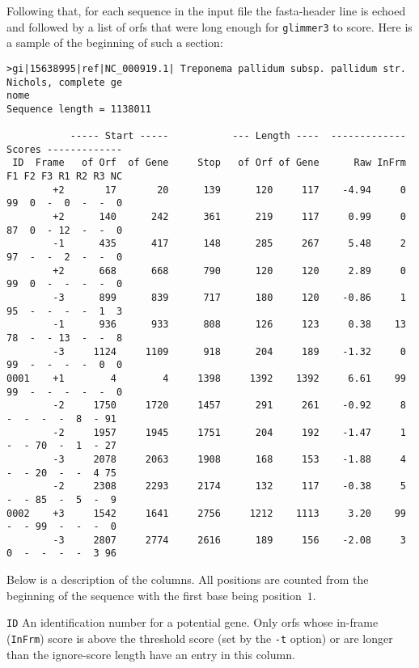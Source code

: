 \documentclass[fleqn,titlepage,11pt]{article}
\def\Pg#1{\texttt{#1}}
\begin{document}
Following that, for each sequence in the input file the
fasta-header line is echoed and followed by a list of orfs
that were long enough for \Pg{glimmer3} to score.  Here is
a sample of the beginning of such a section:
\BSV
\begin{verbatim}
>gi|15638995|ref|NC_000919.1| Treponema pallidum subsp. pallidum str. Nichols, complete ge
nome
Sequence length = 1138011

           ----- Start -----           --- Length ----  ------------- Scores -------------
 ID  Frame   of Orf  of Gene     Stop   of Orf of Gene      Raw InFrm F1 F2 F3 R1 R2 R3 NC
        +2       17       20      139      120     117    -4.94     0 99  0  -  0  -  -  0
        +2      140      242      361      219     117     0.99     0 87  0  - 12  -  -  0
        -1      435      417      148      285     267     5.48     2 97  -  -  2  -  -  0
        +2      668      668      790      120     120     2.89     0 99  0  -  -  -  -  0
        -3      899      839      717      180     120    -0.86     1 95  -  -  -  -  1  3
        -1      936      933      808      126     123     0.38    13 78  -  - 13  -  -  8
        -3     1124     1109      918      204     189    -1.32     0 99  -  -  -  -  0  0
0001    +1        4        4     1398     1392    1392     6.61    99 99  -  -  -  -  -  0
        -2     1750     1720     1457      291     261    -0.92     8  -  -  -  -  8  - 91
        -2     1957     1945     1751      204     192    -1.47     1  -  - 70  -  1  - 27
        -3     2078     2063     1908      168     153    -1.88     4  -  - 20  -  -  4 75
        -2     2308     2293     2174      132     117    -0.38     5  -  - 85  -  5  -  9
0002    +3     1542     1641     2756     1212    1113     3.20    99  -  - 99  -  -  -  0
        -3     2807     2774     2616      189     156    -2.08     3  0  -  -  -  -  3 96
\end{verbatim}
\ESV
Below is a description of the columns.  All positions are counted from the beginning of
the sequence with the first base being position~$1$.
\RaggedRight
\item[\Pg{ID}]
  An identification number for a potential gene.  Only orfs whose in-frame (\Pg{InFrm})
  score is above the threshold score (set by the \Pg{-t} option) or are longer
  than the ignore-score length have an entry
  in this column.
\end{document}

